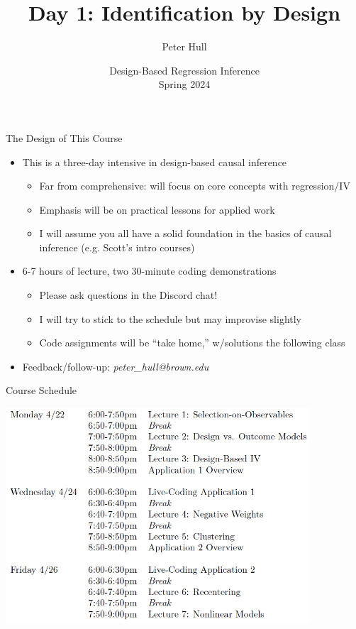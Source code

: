 \documentclass[11pt,english]{beamer}
\begin{document}
\begin{frame}[noframenumbering]{}
\vspace{0.5cm}
\title[]{Day 1: Identification by Design}
\author{Peter Hull}
\date{Design-Based Regression Inference \\Spring 2024} 
\titlepage {\small{}\ }\thispagestyle{empty} \vspace{-30pt}

\end{frame}
 

\begin{frame}{The Design of This Course}
\begin{itemize}
\item This is a three-day intensive in design-based causal inference
\smallskip
\begin{itemize}
\item Far from comprehensive: will focus on core concepts with regression/IV\smallskip
\item Emphasis will be on practical lessons for applied work\smallskip
\item I will assume you all have a solid foundation in the basics of causal inference (e.g. Scott's intro courses)
\end{itemize}\bigskip\pause{}
\item 6-7 hours of lecture, two 30-minute coding demonstrations\smallskip
\begin{itemize}
\item Please ask questions in the Discord chat! \smallskip
\item I will try to stick to the schedule but may improvise slightly\smallskip
\item Code assignments will be ``take home,'' w/solutions the following class
\end{itemize}\bigskip\pause{}
\item Feedback/follow-up: \emph{peter\_hull@brown.edu}
\end{itemize}
\end{frame}

\begin{frame}{Course Schedule}

\begin{center}
\includegraphics[width=0.85\textwidth]{figures/schedule.png}
\end{center}

\end{frame}
\end{document}
